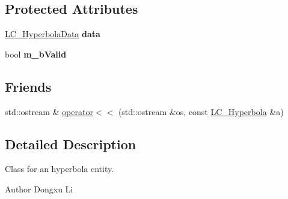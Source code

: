 \subsection*{Protected Attributes}
\begin{DoxyCompactItemize}
\item 
\hypertarget{classLC__Hyperbola_a19be96a9d0e6de97e0e4e6c17af217d7}{\hyperlink{classLC__HyperbolaData}{L\-C\-\_\-\-Hyperbola\-Data} {\bfseries data}}\label{classLC__Hyperbola_a19be96a9d0e6de97e0e4e6c17af217d7}

\item 
\hypertarget{classLC__Hyperbola_a7f0c8925a42fc1daf9c41e9ff1a7c2f6}{bool {\bfseries m\-\_\-b\-Valid}}\label{classLC__Hyperbola_a7f0c8925a42fc1daf9c41e9ff1a7c2f6}

\end{DoxyCompactItemize}
\subsection*{Friends}
\begin{DoxyCompactItemize}
\item 
std\-::ostream \& \hyperlink{classLC__Hyperbola_afcdc3fe06b98be5176d688b13e803140}{operator$<$$<$} (std\-::ostream \&os, const \hyperlink{classLC__Hyperbola}{L\-C\-\_\-\-Hyperbola} \&a)
\end{DoxyCompactItemize}


\subsection{Detailed Description}
Class for an hyperbola entity.

\begin{DoxyAuthor}{Author}
Dongxu Li 
\end{DoxyAuthor}


